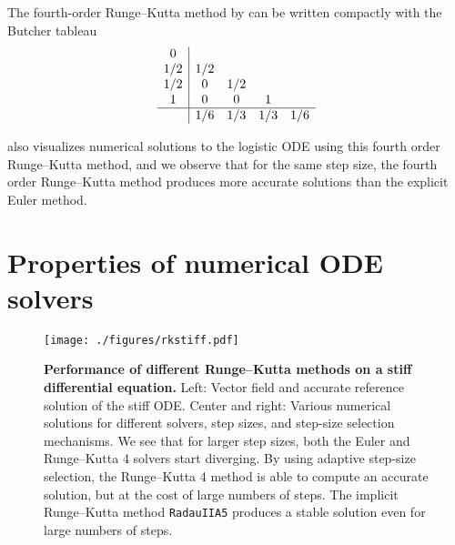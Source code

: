 \documentclass{mimosis}
\begin{document}
\begin{exmple}
The fourth-order Runge--Kutta method by
\textcite{Runge1895}
can be written compactly with the Butcher tableau
\parencite{hairer2008solving}
\begin{equation}
  \begin{array}{c|cccc}
    0 & & & & \\
    1/2 & 1/2 & & & \\
    1/2 & 0 & 1/2 & & \\
    1 & 0 & 0 & 1 & \\
    \hline
    & 1/6 & 1/3 & 1/3 & 1/6
  \end{array}
\end{equation}
\end{exmple}

 also visualizes numerical solutions to the logistic ODE using this fourth order Runge--Kutta method, and we observe that for the same step size, the fourth order Runge--Kutta method produces more accurate solutions than the explicit Euler method.
\section{Properties of numerical ODE solvers}
\label{sec:orgfbd2932}
\label{sec:odes:properties}

\begin{figure}[t]
\centering
\texttt{[image: ./figures/rkstiff.pdf]}
\caption{\label{fig:rkstiff}\textbf{Performance of different Runge--Kutta methods on a stiff differential equation.} Left: Vector field and accurate reference solution of the stiff ODE. Center and right: Various numerical solutions for different solvers, step sizes, and step-size selection mechanisms. We see that for larger step sizes, both the Euler and Runge--Kutta 4 solvers start diverging. By using adaptive step-size selection, the Runge--Kutta 4 method is able to compute an accurate solution, but at the cost of large numbers of steps. The implicit Runge--Kutta method \texttt{RadauIIA5} produces a stable solution even for large numbers of steps.}
\end{figure}
\end{document}
